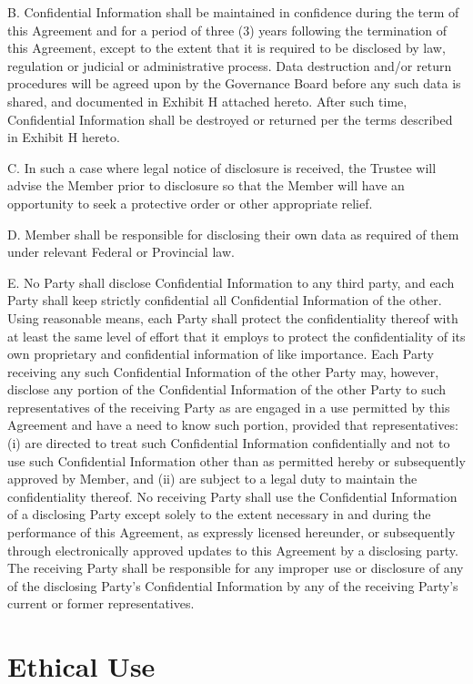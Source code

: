 \documentclass[]{book}
\begin{document}
B. Confidential Information shall be maintained in confidence during the term of this Agreement and for a period of three (3) years following the termination of this Agreement, except to the extent that it is required to be disclosed by law, regulation or judicial or administrative process. Data destruction and/or return procedures will be agreed upon by the Governance Board before any such data is shared, and documented in Exhibit H attached hereto. After such time, Confidential Information shall be destroyed or returned per the terms described in Exhibit H hereto.

C. In such a case where legal notice of disclosure is received, the Trustee will advise the Member prior to disclosure so that the Member will have an opportunity to seek a protective order or other appropriate relief.

D. Member shall be responsible for disclosing their own data as required of them under relevant Federal or Provincial law.

E. No Party shall disclose Confidential Information to any third party, and each Party shall keep strictly confidential all Confidential Information of the other. Using reasonable means, each Party shall protect the confidentiality thereof with at least the same level of effort that it employs to protect the confidentiality of its own proprietary and confidential information of like importance. Each Party receiving any such Confidential Information of the other Party may, however, disclose any portion of the Confidential Information of the other Party to such representatives of the receiving Party as are engaged in a use permitted by this Agreement and have a need to know such portion, provided that representatives: (i) are directed to treat such Confidential Information confidentially and not to use such Confidential Information other than as permitted hereby or subsequently approved by Member, and (ii) are subject to a legal duty to maintain the confidentiality thereof. No receiving Party shall use the Confidential Information of a disclosing Party except solely to the extent necessary in and during the performance of this Agreement, as expressly licensed hereunder, or subsequently through electronically approved updates to this Agreement by a disclosing party. The receiving Party shall be responsible for any improper use or disclosure of any of the disclosing Party's Confidential Information by any of the receiving Party's current or former representatives.

\hypertarget{ethical-use}{%
\chapter{Ethical Use}\label{ethical-use}}
\end{document}

